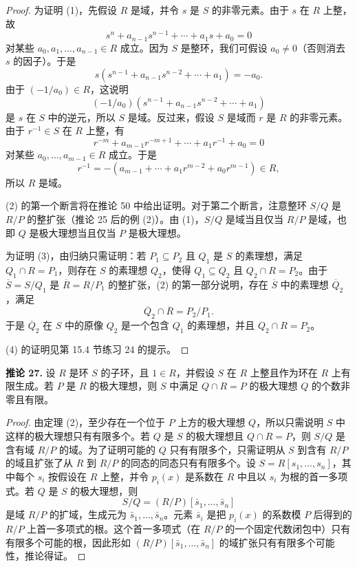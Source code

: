 \begin{proof}
	为证明 (1)，先假设 $R$ 是域，并令 $s$ 是 $S$ 的非零元素。由于 $s$ 在 $R$ 上整，故
	\[
	s^n+a_{n-1}s^{n-1}+\cdots+a_1s+a_0=0
	\]
	对某些 $a_0,a_1,\ldots,a_{n-1}\in R$ 成立。因为 $S$ 是整环，我们可假设 $a_0\ne0$（否则消去 $s$ 的因子）。于是
	\[
	s(s^{n-1}+a_{n-1}s^{n-2}+\cdots+a_1)=-a_0.
	\]
	由于 $(-1/a_0)\in R$，这说明
	\[
	(-1/a_0)(s^{n-1}+a_{n-1}s^{n-2}+\cdots+a_1)
	\]
	是 $s$ 在 $S$ 中的逆元，所以 $S$ 是域。反过来，假设 $S$ 是域而 $r$ 是 $R$ 的非零元素。由于 $r^{-1}\in S$ 在 $R$ 上整，有
	\[
	r^{-m}+a_{m-1}r^{-m+1}+\cdots+a_1r^{-1}+a_0=0
	\]
	对某些 $a_0,\ldots,a_{m-1}\in R$ 成立。于是
	\[
	r^{-1}=-(a_{m-1}+\cdots+a_1r^{m-2}+a_0r^{m-1})\in R,
	\]
	所以 $R$ 是域。
	
	(2) 的第一个断言将在推论 50 中给出证明。对于第二个断言，注意整环 $S/Q$ 是 $R/P$ 的整扩张（推论 25 后的例 (2)）。由 (1)，$S/Q$ 是域当且仅当 $R/P$ 是域，也即 $Q$ 是极大理想当且仅当 $P$ 是极大理想。
	
	为证明 (3)，由归纳只需证明：若 $P_1\subseteq P_2$ 且 $Q_1$ 是 $S$ 的素理想，满足 $Q_1\cap R=P_1$，则存在 $S$ 的素理想 $Q_2$，使得 $Q_1\subseteq Q_2$ 且 $Q_2\cap R=P_2$。由于 $\overline S=S/Q_1$ 是 $\overline R=R/P_1$ 的整扩张，(2) 的第一部分说明，存在 $\overline S$ 中的素理想 $\overline Q_2$，满足
	\[
	\overline Q_2\cap\overline R=P_2/P_1.
	\]
	于是 $\overline Q_2$ 在 $S$ 中的原像 $Q_2$ 是一个包含 $Q_1$ 的素理想，并且 $Q_2\cap R=P_2$。
	
	(4) 的证明见第 15.4 节练习 24 的提示。
\end{proof}

\noindent\textbf{推论 27.} 设 $R$ 是环 $S$ 的子环，且 $1\in R$，并假设 $S$ 在 $R$ 上整且作为环在 $R$ 上有限生成。若 $P$ 是 $R$ 的极大理想，则 $S$ 中满足 $Q\cap R=P$ 的极大理想 $Q$ 的个数非零且有限。

\begin{proof}
	由定理 (2)，至少存在一个位于 $P$ 上方的极大理想 $Q$，所以只需说明 $S$ 中这样的极大理想只有有限多个。若 $Q$ 是 $S$ 的极大理想且 $Q\cap R=P$，则 $S/Q$ 是含有域 $R/P$ 的域。为了证明可能的 $Q$ 只有有限多个，只需证明从 $S$ 到含有 $R/P$ 的域且扩张了从 $R$ 到 $R/P$ 的同态的同态只有有限多个。设 $S=R[s_1,
	\ldots,s_n]$，其中每个 $s_i$ 按假设在 $R$ 上整，并令 $p_i(x)$ 是系数在 $R$ 中且以 $s_i$ 为根的首一多项式。若 $Q$ 是 $S$ 的极大理想，则
	\[
	S/Q=(R/P)[\bar s_1,\ldots,\bar s_n]
	\]
	是域 $R/P$ 的扩域，生成元为 $\bar s_1,
	\ldots,
	\bar s_n$。元素 $\bar s_i$ 是把 $p_i(x)$ 的系数模 $P$ 后得到的 $R/P$ 上首一多项式的根。这个首一多项式（在 $R/P$ 的一个固定代数闭包中）只有有限多个可能的根，因此形如 $(R/P)[\bar s_1,
	\ldots,
	\bar s_n]$ 的域扩张只有有限多个可能性，推论得证。
\end{proof}

